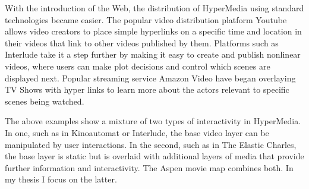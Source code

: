 With the introduction of the Web, the distribution of HyperMedia using standard technologies became easier. The popular video distribution platform Youtube\cite{youtube} allows video creators to place simple hyperlinks on a specific time and location in their videos that link to other videos published by them. Platforms such as Interlude\cite{interlude} take it a step further by making it easy to create and publish nonlinear videos, where users can make plot decisions and control which scenes are displayed next. Popular streaming service Amazon Video \cite{amazonvideo} have began overlaying TV Shows with hyper links to learn more about the actors relevant to specific scenes being watched.

The above examples show a mixture of two types of interactivity in HyperMedia. In one, such as in Kinoautomat or Interlude, the base video layer can be manipulated by user interactions. In the second, such as in The Elastic Charles, the base layer is static but is overlaid with additional layers of media that provide further information and interactivity. The Aspen movie map combines both. In my thesis I focus on the latter.  



